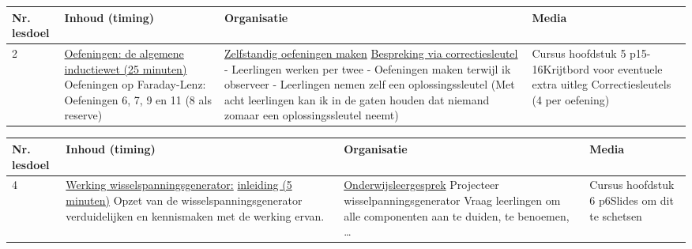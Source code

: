 \begin{landscape}
	\begin{tabularx}{1.56\textwidth}{|p{1.5cm}|p{6.5cm}|X|p{4cm}|}
		\hline
		\textbf{Nr. lesdoel } & \textbf{Inhoud (timing)}  & \textbf{Organisatie } & \textbf{Media } \\ \hline
		2\newline\newline3	&\underline{Oefeningen: de algemene} \underline{inductiewet (25 minuten)}\newline
			Oefeningen op Faraday-Lenz: Oefeningen 6, 7, 9 en 11 (8 als reserve)
		&  \underline{Zelfstandig oefeningen maken} \underline{Bespreking via correctiesleutel}\newline 
		- Leerlingen werken per twee\newline
			- Oefeningen maken terwijl ik observeer\newline
			- Leerlingen nemen zelf een oplossingssleutel (Met acht leerlingen kan ik in de gaten houden dat niemand zomaar een oplossingssleutel neemt)
		&   Cursus hoofdstuk 5 p15-16\newline\newline Krijtbord voor eventuele extra uitleg \newline\newline Correctiesleutels (4 per oefening)
		\\ \hline
	\end{tabularx}\vspace{5mm}



\begin{tabularx}{1.56\textwidth}{|p{1.5cm}|p{6.5cm}|X|p{4cm}|}
	\hline
	\textbf{Nr. lesdoel } & \textbf{Inhoud (timing)}  & \textbf{Organisatie } & \textbf{Media } \\ \hline
    4 & \underline{Werking wisselspanningsgenerator:} \underline{inleiding (5 minuten)}\newline
    	Opzet van de wisselspanningsgenerator verduidelijken en kennismaken met de werking ervan.
	&  \underline{Onderwijsleergesprek}\newline
	Projecteer wisselpanningsgenerator\newline
	Vraag leerlingen om alle componenten aan te duiden, te benoemen, \ldots 
	&  Cursus hoofdstuk 6 p6\newline\newline Slides om dit te schetsen
	\\ \hline
\end{tabularx}\vspace{5mm}



\end{landscape}
